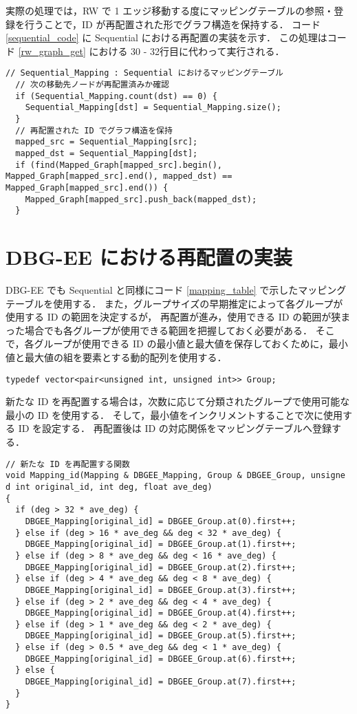 実際の処理では，RW で 1 エッジ移動する度にマッピングテーブルの参照・登録を行うことで，ID が再配置された形でグラフ構造を保持する．
コード \ref{sequential_code} に Sequential における再配置の実装を示す．
この処理はコード \ref{rw_graph_get} における 30 - 32行目に代わって実行される． 
\begin{lstlisting}[caption=Sequential における再配置, label=sequential_code]
  // Sequential_Mapping : Sequential におけるマッピングテーブル
  // 次の移動先ノードが再配置済みか確認 
  if (Sequential_Mapping.count(dst) == 0) {
    Sequential_Mapping[dst] = Sequential_Mapping.size();
  }
  // 再配置された ID でグラフ構造を保持
  mapped_src = Sequential_Mapping[src];
  mapped_dst = Sequential_Mapping[dst];
  if (find(Mapped_Graph[mapped_src].begin(), Mapped_Graph[mapped_src].end(), mapped_dst) == Mapped_Graph[mapped_src].end()) {
    Mapped_Graph[mapped_src].push_back(mapped_dst);
  }
\end{lstlisting}
\section{DBG-EE における再配置の実装}
DBG-EE でも Sequential と同様にコード \ref{mapping_table} で示したマッピングテーブルを使用する．
また，グループサイズの早期推定によって各グループが使用する ID の範囲を決定するが，
再配置が進み，使用できる ID の範囲が狭まった場合でも各グループが使用できる範囲を把握しておく必要がある．
そこで，各グループが使用できる ID の最小値と最大値を保存しておくために，最小値と最大値の組を要素とする動的配列を使用する．
\begin{lstlisting}[caption=グラフ構造, label=data_structure]
  typedef vector<pair<unsigned int, unsigned int>> Group; 
\end{lstlisting}

新たな ID を再配置する場合は，次数に応じて分類されたグループで使用可能な最小の ID を使用する．
そして，最小値をインクリメントすることで次に使用する ID を設定する．
再配置後は ID の対応関係をマッピングテーブルへ登録する．

\begin{lstlisting}[caption=DBG-EE における再配置, label=dbgee-reordering]
// 新たな ID を再配置する関数
void Mapping_id(Mapping & DBGEE_Mapping, Group & DBGEE_Group, unsigne
d int original_id, int deg, float ave_deg)
{
  if (deg > 32 * ave_deg) {
    DBGEE_Mapping[original_id] = DBGEE_Group.at(0).first++;
  } else if (deg > 16 * ave_deg && deg < 32 * ave_deg) {
    DBGEE_Mapping[original_id] = DBGEE_Group.at(1).first++;
  } else if (deg > 8 * ave_deg && deg < 16 * ave_deg) {
    DBGEE_Mapping[original_id] = DBGEE_Group.at(2).first++;
  } else if (deg > 4 * ave_deg && deg < 8 * ave_deg) {
    DBGEE_Mapping[original_id] = DBGEE_Group.at(3).first++;
  } else if (deg > 2 * ave_deg && deg < 4 * ave_deg) {
    DBGEE_Mapping[original_id] = DBGEE_Group.at(4).first++;
  } else if (deg > 1 * ave_deg && deg < 2 * ave_deg) {
    DBGEE_Mapping[original_id] = DBGEE_Group.at(5).first++;
  } else if (deg > 0.5 * ave_deg && deg < 1 * ave_deg) {
    DBGEE_Mapping[original_id] = DBGEE_Group.at(6).first++;
  } else {
    DBGEE_Mapping[original_id] = DBGEE_Group.at(7).first++;
  }
}
\end{lstlisting}

